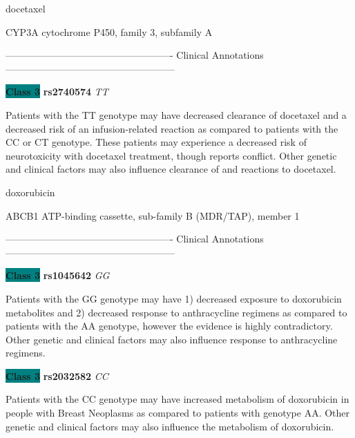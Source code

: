 \documentclass{resume} %
\begin{document}
\begin{rSection}{ docetaxel }
\begin{rSubsection}{ CYP3A }{ cytochrome P450, family 3, subfamily A }{}{}
\item[]

\item[] ---------------------------------------------------- Clinical Annotations -----------------------------------------------------\newline
\item \textbf{\colorbox{teal} {Class 3}} \textbf{ rs2740574 } \textit{ TT }
\item[] Patients with the TT genotype may have decreased clearance of docetaxel and a decreased risk of an infusion-related reaction as compared to patients with the CC or CT genotype. These patients may experience a decreased risk of neurotoxicity with docetaxel treatment, though reports conflict. Other genetic and clinical factors may also influence clearance of and reactions to docetaxel.
\end{rSubsection}

\end{rSection}\begin{rSection}{ doxorubicin }
\item[]

\begin{rSubsection}{ ABCB1 }{ ATP-binding cassette, sub-family B (MDR/TAP), member 1 }{}{}
\item[]

\item[] ---------------------------------------------------- Clinical Annotations -----------------------------------------------------\newline
\item \textbf{\colorbox{teal} {Class 3}} \textbf{ rs1045642 } \textit{ GG }
\item[] Patients with the GG genotype may have 1) decreased exposure to doxorubicin metabolites and 2) decreased response to anthracycline regimens as compared to patients with the AA genotype, however the evidence is highly contradictory. Other genetic and clinical factors may also influence response to anthracycline regimens.\item \textbf{\colorbox{teal} {Class 3}} \textbf{ rs2032582 } \textit{ CC }
\item[] Patients with the  CC genotype may have increased metabolism of doxorubicin in people with Breast Neoplasms as compared to patients with genotype AA. Other genetic and clinical factors may also influence the metabolism of doxorubicin.
\end{rSubsection}


\end{rSection}
\end{document}
